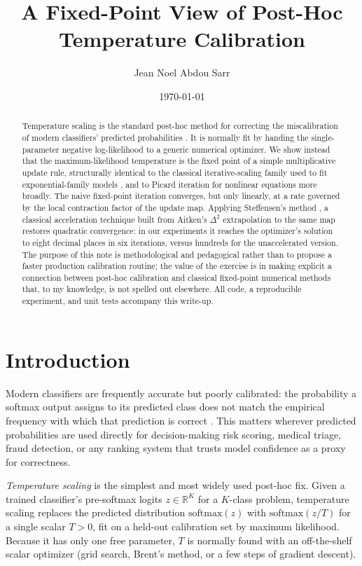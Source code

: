 \documentclass[11pt]{article}
\title{A Fixed-Point View of Post-Hoc Temperature Calibration}
\author[1]{Jean Noel Abdou Sarr}
\affil[1]{Independent research note}
\date{\today}
\begin{document}
\maketitle

\begin{abstract}
Temperature scaling is the standard post-hoc method for correcting the
miscalibration of modern classifiers' predicted probabilities
\citep{guo2017calibration}. It is normally fit by handing the
single-parameter negative log-likelihood to a generic numerical
optimizer. We show instead that the maximum-likelihood temperature is
the fixed point of a simple multiplicative update rule, structurally
identical to the classical iterative-scaling family used to fit
exponential-family models \citep{darroch1972generalized,
dellapietra1997inducing}, and to Picard iteration for nonlinear
equations more broadly. The naive fixed-point iteration converges, but
only linearly, at a rate governed by the local contraction factor of
the update map. Applying Steffensen's method
\citep{steffensen1933remarks}, a classical acceleration technique
built from Aitken's $\Delta^2$ extrapolation \citep{aitken1926bernoulli}
 to the same map restores quadratic convergence: in our experiments
it reaches the optimizer's solution to eight decimal places in six
iterations, versus hundreds for the unaccelerated version. The purpose
of this note is methodological and pedagogical rather than to propose
a faster production calibration routine; the value of the exercise is
in making explicit a connection between post-hoc calibration and
classical fixed-point numerical methods that, to my
knowledge, is not spelled out elsewhere. All code, a reproducible
experiment, and unit tests accompany this write-up.
\end{abstract}

\section{Introduction}

Modern classifiers are frequently accurate but poorly calibrated: the
probability a softmax output assigns to its predicted class does not
match the empirical frequency with which that prediction is correct
\citep{guo2017calibration}. This matters wherever predicted
probabilities are used directly for decision-making risk scoring,
medical triage, fraud detection, or any ranking system that trusts
model confidence as a proxy for correctness.

\emph{Temperature scaling} is the simplest and most widely used
post-hoc fix. Given a trained classifier's pre-softmax logits
$z \in \mathbb{R}^K$ for a $K$-class problem, temperature scaling
replaces the predicted distribution $\mathrm{softmax}(z)$ with
$\mathrm{softmax}(z / T)$ for a single scalar $T > 0$, fit on a held-out
calibration set by maximum likelihood. Because it has only one free
parameter, $T$ is normally found with an off-the-shelf scalar
optimizer (grid search, Brent's method, or a few steps of gradient
descent).
\end{document}
